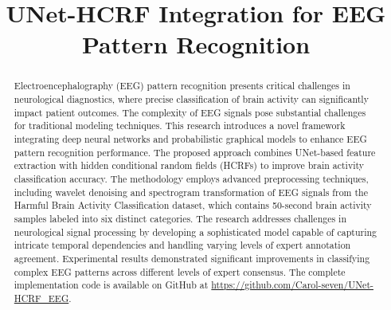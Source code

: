 \documentclass[conference]{IEEEtran}
\begin{document}
\title{\huge UNet-HCRF Integration for EEG Pattern Recognition}

\author{
\and
{}
\and
{}
}

\maketitle


\begin{abstract}


Electroencephalography (EEG) pattern recognition presents critical challenges
in neurological diagnostics, where precise classification of brain activity can
significantly impact patient outcomes. The complexity of EEG signals pose
substantial challenges for traditional modeling techniques. This research
introduces a novel framework integrating deep neural networks and probabilistic
graphical models to enhance EEG pattern recognition performance. The proposed
approach combines UNet-based feature extraction with hidden conditional random
fields (HCRFs) to improve brain activity classification accuracy.
The methodology employs advanced preprocessing techniques, including wavelet
denoising and spectrogram transformation of EEG signals from the Harmful Brain
Activity Classification dataset, which contains 50-second brain activity
samples labeled into six distinct categories. The research addresses challenges
in neurological signal processing by developing a sophisticated model capable
of capturing intricate temporal dependencies and handling varying levels of
expert annotation agreement. Experimental results demonstrated significant
improvements in classifying complex EEG patterns across different levels of
expert consensus. The complete implementation code is available on GitHub at
\url{https://github.com/Carol-seven/UNet-HCRF_EEG}.


\end{abstract}
\end{document}
